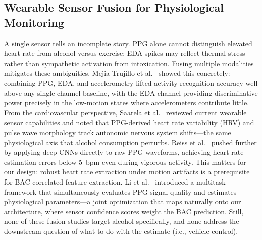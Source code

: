 \documentclass[HARVARD,Times2COL]{WileyNJDv5}
\begin{document}
\subsection{Wearable Sensor Fusion for Physiological Monitoring}
A single sensor tells an incomplete story. PPG alone cannot distinguish elevated heart rate from alcohol versus exercise; EDA spikes may reflect thermal stress rather than sympathetic activation from intoxication. Fusing multiple modalities mitigates these ambiguities. Mejia-Trujillo et al.~\citep{mejia2024} showed this concretely: combining PPG, EDA, and accelerometry lifted activity recognition accuracy well above any single-channel baseline, with the EDA channel providing discriminative power precisely in the low-motion states where accelerometers contribute little.
From the cardiovascular perspective, Saarela et al.~\citep{saarela2025} reviewed current wearable sensor capabilities and noted that PPG-derived heart rate variability (HRV) and pulse wave morphology track autonomic nervous system shifts---the same physiological axis that alcohol consumption perturbs. Reiss et al.~\citep{reiss2019} pushed further by applying deep CNNs directly to raw PPG waveforms, achieving heart rate estimation errors below 5~bpm even during vigorous activity. This matters for our design: robust heart rate extraction under motion artifacts is a prerequisite for BAC-correlated feature extraction.
Li et al.~\citep{li2025multitask} introduced a multitask framework that simultaneously evaluates PPG signal quality and estimates physiological parameters---a joint optimization that maps naturally onto our architecture, where sensor confidence scores weight the BAC prediction. Still, none of these fusion studies target alcohol specifically, and none address the downstream question of what to do with the estimate (i.e., vehicle control).
\end{document}
